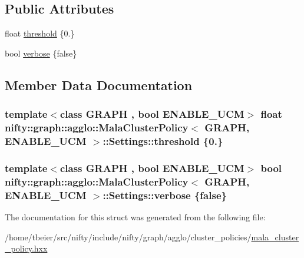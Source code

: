 \subsection*{Public Attributes}
\begin{DoxyCompactItemize}
\item 
float \hyperlink{structnifty_1_1graph_1_1agglo_1_1MalaClusterPolicy_1_1Settings_a481d8fd0a487b71ad67d1ea1f1ce51a0}{threshold} \{0.\}
\item 
bool \hyperlink{structnifty_1_1graph_1_1agglo_1_1MalaClusterPolicy_1_1Settings_ab892447b233b3e89473ad3fee83a305e}{verbose} \{false\}
\end{DoxyCompactItemize}


\subsection{Member Data Documentation}
\hypertarget{structnifty_1_1graph_1_1agglo_1_1MalaClusterPolicy_1_1Settings_a481d8fd0a487b71ad67d1ea1f1ce51a0}{}
\subsubsection[{threshold}]{\setlength{\rightskip}{0pt plus 5cm}template$<$class G\+R\+A\+P\+H , bool E\+N\+A\+B\+L\+E\+\_\+\+U\+C\+M$>$ float {\bf nifty\+::graph\+::agglo\+::\+Mala\+Cluster\+Policy}$<$ G\+R\+A\+P\+H, E\+N\+A\+B\+L\+E\+\_\+\+U\+C\+M $>$\+::Settings\+::threshold \{0.\}}\label{structnifty_1_1graph_1_1agglo_1_1MalaClusterPolicy_1_1Settings_a481d8fd0a487b71ad67d1ea1f1ce51a0}
\hypertarget{structnifty_1_1graph_1_1agglo_1_1MalaClusterPolicy_1_1Settings_ab892447b233b3e89473ad3fee83a305e}{}
\subsubsection[{verbose}]{\setlength{\rightskip}{0pt plus 5cm}template$<$class G\+R\+A\+P\+H , bool E\+N\+A\+B\+L\+E\+\_\+\+U\+C\+M$>$ bool {\bf nifty\+::graph\+::agglo\+::\+Mala\+Cluster\+Policy}$<$ G\+R\+A\+P\+H, E\+N\+A\+B\+L\+E\+\_\+\+U\+C\+M $>$\+::Settings\+::verbose \{false\}}\label{structnifty_1_1graph_1_1agglo_1_1MalaClusterPolicy_1_1Settings_ab892447b233b3e89473ad3fee83a305e}


The documentation for this struct was generated from the following file\+:\begin{DoxyCompactItemize}
\item 
/home/tbeier/src/nifty/include/nifty/graph/agglo/cluster\+\_\+policies/\hyperlink{mala__cluster__policy_8hxx}{mala\+\_\+cluster\+\_\+policy.\+hxx}\end{DoxyCompactItemize}
